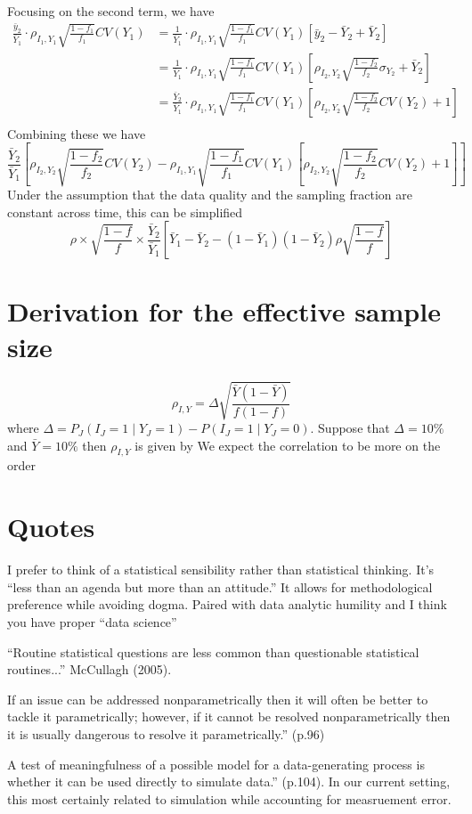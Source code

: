 \documentclass[11pt]{article}
\numberwithin{equation}{section}
\theoremstyle{plain}
\begin{document}
Focusing on the second term, we have
$$
\begin{aligned}
\frac{\bar y_2}{\bar Y_1} \cdot \rho_{I_1,Y_1} \sqrt{\frac{1-f_1}{f_1}} CV (Y_1) &= \frac{1}{\bar Y_1} \cdot \rho_{I_1,Y_1} \sqrt{\frac{1-f_1}{f_1}} CV (Y_1) \left[ \bar y_2 - \bar Y_2 + \bar Y_2 \right] \\
&= \frac{1}{\bar Y_1} \cdot \rho_{I_1,Y_1} \sqrt{\frac{1-f_1}{f_1}} CV (Y_1) \left[ \rho_{I_2, Y_2} \sqrt{\frac{1-f_2}{f_2}} \sigma_{Y_2} + \bar Y_2 \right] \\
&= \frac{\bar Y_2}{\bar Y_1} \cdot \rho_{I_1,Y_1} \sqrt{\frac{1-f_1}{f_1}} CV (Y_1) \left[ \rho_{I_2, Y_2} \sqrt{\frac{1-f_2}{f_2}} CV(Y_2) + 1 \right] \\
\end{aligned}
$$
Combining these we have
$$
\frac{\bar Y_2}{\bar Y_1} \left[ \rho_{I_2, Y_2} \sqrt{\frac{1-f_2}{f_2}} CV(Y_2)  - \rho_{I_1,Y_1} \sqrt{\frac{1-f_1}{f_1}} CV (Y_1) \left[ \rho_{I_2, Y_2} \sqrt{\frac{1-f_2}{f_2}} CV(Y_2) + 1 \right] \right]
$$
Under the assumption that the data quality and the sampling fraction are constant across time, this can be simplified
$$
\rho \times \sqrt{\frac{1-f}{f}} \times \frac{\bar Y_2}{\bar Y_1} \left[ \bar Y_1 - \bar Y_2 - (1-\bar Y_1)(1-\bar Y_2) \rho \sqrt{\frac{1-f}{f}} \right]
$$

\section{Derivation for the effective sample size}

\begin{equation} \label{eq:binaryrho}
\rho_{I,Y} = \Delta \sqrt{\frac{\bar Y (1 - \bar Y)}{f (1-f)} }
\end{equation}
where $\Delta = P_J (I_J = 1 \mid Y_J = 1) - P(I_J = 1 \mid Y_J = 0)$.  Suppose that $\Delta = 10\%$ and $\bar Y = 10\%$ then $\rho_{I,Y}$ is given by
We expect the correlation to be more on the order



\section{Quotes}

I prefer to think of a statistical sensibility rather than statistical thinking. It’s “less than an agenda but more than an attitude.”  It allows for methodological preference while avoiding dogma. Paired with data analytic humility and I think you have proper “data science”

“Routine statistical questions are less common than questionable statistical routines...” McCullagh (2005).

If an issue can be addressed nonparametrically then it will often be better to tackle it parametrically; however, if it cannot be resolved nonparametrically then it is usually dangerous to resolve it parametrically.” (p.96)

A test of meaningfulness of a possible model for a data-generating process is whether it can be used directly to simulate data.” (p.104).  In our current setting, this most certainly related to simulation while accounting for measruement error.
\end{document}
